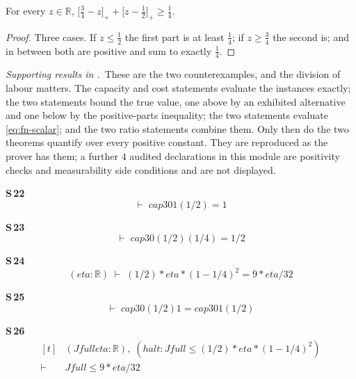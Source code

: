 \begin{lemma}
\label{lem:fn-posparts}
For every $z\in\mathbb{R}$,
$\bigl[\tfrac34-z\bigr]_{+}+\bigl[z-\tfrac12\bigr]_{+}\ge\tfrac14$.
\end{lemma}

\begin{proof}
Three cases. If $z\le\tfrac12$ the first part is at least $\tfrac14$; if $z\ge\tfrac34$ the
second is; and in between both are positive and sum to exactly $\tfrac14$.
\end{proof}


\noindent\emph{Supporting results in .}~These are the two counterexamples, and the division of labour matters. The capacity and cost statements evaluate the instances exactly; the two  statements bound the true value, one above by an exhibited alternative and one below by the positive-parts inequality; the two  statements evaluate \eqref{eq:fn-scalar}; and the two ratio statements combine them. Only then do the two  theorems quantify over every positive constant. They are reproduced as the prover has them; a further $4$ audited declarations in this module are positivity checks and measurability side conditions and are not displayed.

\noindent\textbf{S\,22}\quad{}
{\footnotesize\[ \vdash\; \mathit{cap3} 0 1 (1/2) = 1 \]}

\noindent\textbf{S\,23}\quad{}
{\footnotesize\[ \vdash\; \mathit{cap3} 0 (1/2) (1/4) = 1/2 \]}

\noindent\textbf{S\,24}\quad{}
{\footnotesize\[ (\mathit{eta} : \mathbb{R} ) \;\vdash\; (1/2) * \mathit{eta} * (1 - 1/4) ^{2} = 9 * \mathit{eta} / 32 \]}

\noindent\textbf{S\,25}\quad{}
{\footnotesize\[ \vdash\; \mathit{cap3} 0 (1/2) 1 = \mathit{cap3} 0 1 (1/2) \]}

\noindent\textbf{S\,26}\quad{}
{\footnotesize\[ \begin{aligned}[t]
&(\mathit{Jfull} \mathit{eta} : \mathbb{R} ),\; (\mathit{halt} : \mathit{Jfull} \leq (1/2) * \mathit{eta} * (1 - 1/4) ^{2})\\
\vdash\;&\mathit{Jfull} \leq 9 * \mathit{eta} / 32
\end{aligned} \]}

